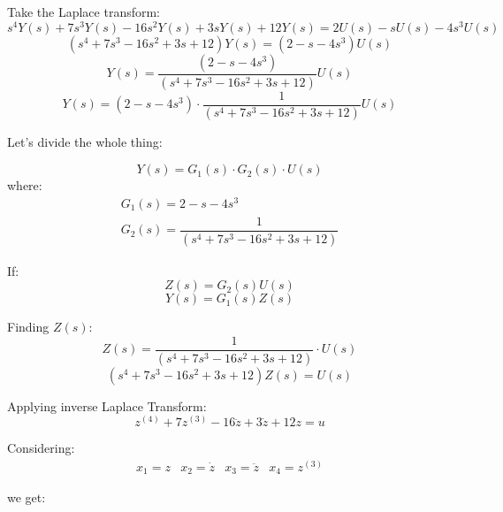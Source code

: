\documentclass[10pt,a4paper]{article}
\begin{document}
Take the Laplace transform:
\[ s^{4}Y(s) + 7s^{3}Y(s) - 16s^{2}Y(s) + 3sY(s) + 12Y(s) = 2U(s) - sU(s) - 4s^{3}U(s) \]
\[ ( s^{4} + 7s^{3} - 16s^{2} + 3s + 12 )Y(s) = ( 2 - s - 4s^{3} )U(s) \]
\[ Y(s) = \dfrac{( 2 - s - 4s^{3} )}{( s^{4} + 7s^{3} - 16s^{2} + 3s + 12 )} U(s)\]
\[ Y(s) = ( 2 - s - 4s^{3} ) \cdot \dfrac{1}{( s^{4} + 7s^{3} - 16s^{2} + 3s + 12 )} U(s)\]

Let's divide the whole thing:

\[ Y(s) = G_{1}(s) \cdot G_{2}(s) \cdot U(s) \]
where:
\[ \begin{matrix}
G_{1}(s) = 2 - s - 4s^{3} \\
G_{2}(s) = \dfrac{1}{( s^{4} + 7s^{3} - 16s^{2} + 3s + 12 )} 
\end{matrix} \]

If:
\[ Z(s) = G_{2}(s)U(s) \]
\[ Y(s) = G_{1}(s)Z(s) \]

Finding $Z(s)$:
\[ Z(s) = \dfrac{1}{( s^{4} + 7s^{3} - 16s^{2} + 3s + 12 )} \cdot U(s) \]
\[ ( s^{4} + 7s^{3} - 16s^{2} + 3s + 12 )Z(s) = U(s) \]

Applying inverse Laplace Transform:
\[ z^{(4)} + 7z^{(3)} - 16\ddot{z} + 3\dot{z} + 12z = u \]

Considering: 
\begin{equation} 
\begin{matrix}
  x_{1} = z & x_{2} = \dot{z} & x_{3} = \ddot{z} & x_{4} = z^{(3)} 
  \end{matrix}
\label{eq:3_1}   
\end{equation}

we get:
\begin{center}
\end{center}
\end{document}
